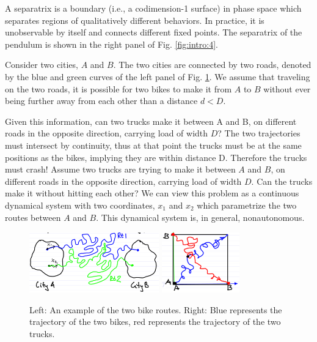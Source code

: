 \begin{ex}[Pendulum]
\begin{figure}[H]
\end{figure}
\begin{definition}[Separatrix]
	A separatrix is a boundary (i.e., a codimension-1 surface) in phase space which separates regions of qualitatively different behaviors. In practice, it is unobservable by itself and connects different fixed points. The separatrix of the pendulum is shown in the right panel of Fig. \ref{fig:intro:4}. 
\end{definition}

\end{ex}

\begin{ex}
	Consider two cities, $A$ and $B$. The two cities are connected by two roads, denoted by the blue and green curves of the left panel of Fig. \ref{fig:intro:5}. We assume that traveling on the two roads, it is possible for two bikes to make it from $A$ to $B$ without ever being further away from each other than a distance $d<D$. 
	
	Given this information, can two trucks make it between A and B, on different roads in the opposite direction, carrying load of width $D$?
The two trajectories must intersect by continuity, thus at that point the trucks must be at the same positions as the bikes, implying they are within distance D. Therefore the trucks must crash!
	Assume two trucks are trying to make it between $A$ and $B$, on different roads in the opposite direction, carrying load of width $D$. Can the trucks make it without hitting each other? We can view this problem as a continuous dynamical system with two coordinates, $x_1$ and $x_2$ which parametrize the two routes between $A$ and $B$. This dynamical system is, in general, nonautonomous. 
		\begin{figure}[H]
		\centering
		\includegraphics[width=0.5\textwidth]{figures/intro/7routes.png}
		\hspace{0.05\textwidth}
		\includegraphics[width=0.3\textwidth]{figures/intro/8truck_geometry.png}
		\caption{Left: An example of the two bike routes. Right: Blue represents the trajectory of the two bikes, red represents the trajectory of the two trucks.}
		\label{fig:intro:5}
	\end{figure}
	

\end{ex}
